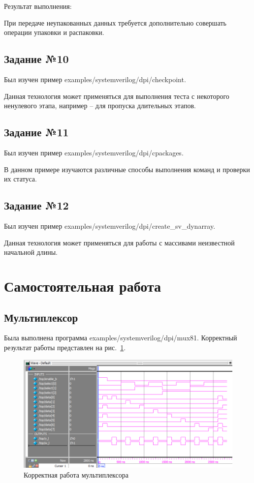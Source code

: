 \documentclass[a4paper,14pt]{article}
\begin{document}
	Результат выполнения:
	{\small {}}
	
	При передаче неупакованных данных требуется дополнительно совершать операции упаковки и распаковки.
	
	\subsection{Задание №10}
	
	Был изучен пример examples/systemverilog/dpi/checkpoint.
	
	Данная технология может применяться для выполнения теста с некоторого ненулевого этапа,
	например -- для пропуска длительных этапов.
	
	\subsection{Задание №11}
	
	Был изучен пример examples/systemverilog/dpi/cpackages.
	
	В данном примере изучаются различные способы выполнения команд и проверки их статуса.
	
	\subsection{Задание №12}
	
	Был изучен пример examples/systemverilog/dpi/create\_sv\_dynarray.
	
	Данная технология может применяться для работы с массивами неизвестной начальной длины.
	
    \section{Самостоятельная работа}
    
    \subsection{Мультиплексор}
    
    Была выполнена программа examples/systemverilog/dpi/mux81.
    Корректный результат работы представлен на рис.~\ref{fig:02_mux_ok}.
    
    \begin{figure}[H]
    	\centering
    	\includegraphics[width=\linewidth]{images/02_mux_ok}
    	\caption{Корректная работа мультиплексора}
    	\label{fig:02_mux_ok}
    \end{figure}
    
\end{document}

